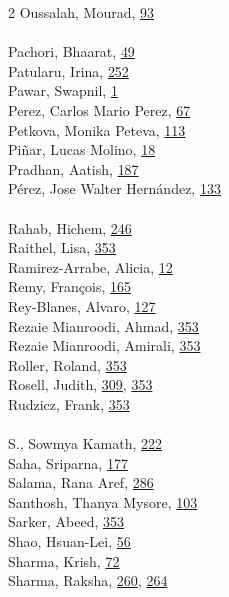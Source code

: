 \documentclass[11pt,oneside]{book}
\begin{document}
\begin{multicols}{2}
Oussalah, Mourad, \hyperlink{page.93}{93}\\
\\ %
Pachori, Bhaarat, \hyperlink{page.49}{49}\\
Patularu, Irina, \hyperlink{page.252}{252}\\
Pawar, Swapnil, \hyperlink{page.1}{1}\\
Perez, Carlos Mario Perez, \hyperlink{page.67}{67}\\
Petkova, Monika Peteva, \hyperlink{page.113}{113}\\
Piñar, Lucas Molino, \hyperlink{page.18}{18}\\
Pradhan, Aatish, \hyperlink{page.187}{187}\\
Pérez, Jose Walter Hernández, \hyperlink{page.133}{133}\\
\\ %
Rahab, Hichem, \hyperlink{page.246}{246}\\
Raithel, Lisa, \hyperlink{page.353}{353}\\
Ramirez-Arrabe, Alicia, \hyperlink{page.12}{12}\\
Remy, François, \hyperlink{page.165}{165}\\
Rey-Blanes, Alvaro, \hyperlink{page.127}{127}\\
Rezaie Mianroodi, Ahmad, \hyperlink{page.353}{353}\\
Rezaie Mianroodi, Amirali, \hyperlink{page.353}{353}\\
Roller, Roland, \hyperlink{page.353}{353}\\
Rosell, Judith, \hyperlink{page.309}{309}, \hyperlink{page.353}{353}\\
Rudzicz, Frank, \hyperlink{page.353}{353}\\
\\ %
S., Sowmya Kamath, \hyperlink{page.222}{222}\\
Saha, Sriparna, \hyperlink{page.177}{177}\\
Salama, Rana Aref, \hyperlink{page.286}{286}\\
Santhosh, Thanya Mysore, \hyperlink{page.103}{103}\\
Sarker, Abeed, \hyperlink{page.353}{353}\\
Shao, Hsuan-Lei, \hyperlink{page.56}{56}\\
Sharma, Krish, \hyperlink{page.72}{72}\\
Sharma, Raksha, \hyperlink{page.260}{260}, \hyperlink{page.264}{264}\\

\end{multicols}
\end{document}
